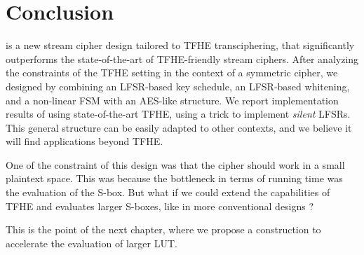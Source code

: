 \section{Conclusion}
\label{sec:conclusion}


\coolName{} is a new stream cipher design tailored to \gls{TFHE}
transciphering, that significantly outperforms the state-of-the-art of
\gls{TFHE}-friendly stream ciphers.  After analyzing the constraints of the
\gls{TFHE} setting in the context of a symmetric cipher, we designed
\coolName{} by combining an LFSR-based key schedule, an LFSR-based
whitening, and a non-linear FSM with an \gls{AES}-like structure.  We report
implementation results of \coolName{} using state-of-the-art \gls{TFHE}, using
a trick to implement \emph{silent} LFSRs.  This general structure can be
easily adapted to other contexts, and we believe it will find
applications beyond \gls{TFHE}.


One of the constraint of this design was that the cipher should work in a small plaintext space. This was because the bottleneck in terms of running time was the evaluation of the S-box. But what if we could extend the capabilities of \gls{TFHE} and evaluates larger S-boxes, like in more conventional designs ?

This is the point of the next chapter, where we propose a construction to accelerate the evaluation of larger \gls{LUT}.

